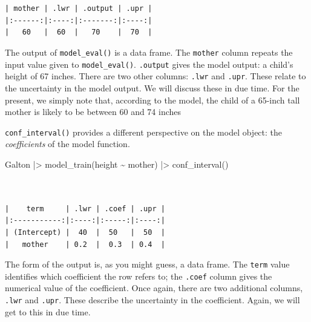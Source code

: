 \documentclass[
  letterpaper,
  DIV=11,
  numbers=noendperiod,
  oneside]{scrartcl}
\newenvironment{Shaded}{\begin{snugshade}}{\end{snugshade}}
\newcommand{\FunctionTok}[1]{\textcolor[rgb]{0.28,0.35,0.67}{#1}}
\newcommand{\NormalTok}[1]{\textcolor[rgb]{0.00,0.23,0.31}{#1}}
\newcommand{\SpecialCharTok}[1]{\textcolor[rgb]{0.37,0.37,0.37}{#1}}
\begin{document}
\begin{verbatim}


| mother | .lwr | .output | .upr |
|:------:|:----:|:-------:|:----:|
|   60   |  60  |   70    |  70  |
\end{verbatim}

The output of \texttt{model\_eval()} is a data frame. The
\texttt{mother} column repeats the input value given to
\texttt{model\_eval()}. \texttt{.output} gives the model output: a
child's height of 67 inches. There are two other columns: \texttt{.lwr}
and \texttt{.upr}. These relate to the uncertainty in the model output.
We will discuss these in due time. For the present, we simply note that,
according to the model, the child of a 65-inch tall mother is likely to
be between 60 and 74 inches

\texttt{conf\_interval()} provides a different perspective on the model
object: the \emph{coefficients} of the model function.

\begin{Shaded}
\begin{Highlighting}[]
\NormalTok{Galton }\SpecialCharTok{|\textgreater{}} \FunctionTok{model\_train}\NormalTok{(height }\SpecialCharTok{\textasciitilde{}}\NormalTok{ mother) }\SpecialCharTok{|\textgreater{}} \FunctionTok{conf\_interval}\NormalTok{()}
\end{Highlighting}
\end{Shaded}

\begin{verbatim}


|    term     | .lwr | .coef | .upr |
|:-----------:|:----:|:-----:|:----:|
| (Intercept) |  40  |  50   |  50  |
|   mother    | 0.2  |  0.3  | 0.4  |
\end{verbatim}

The form of the output is, as you might guess, a data frame. The
\texttt{term} value identifies which coefficient the row refers to; the
\texttt{.coef} column gives the numerical value of the coefficient. Once
again, there are two additional columns, \texttt{.lwr} and
\texttt{.upr}. These describe the uncertainty in the coefficient. Again,
we will get to this in due time.
\end{document}
